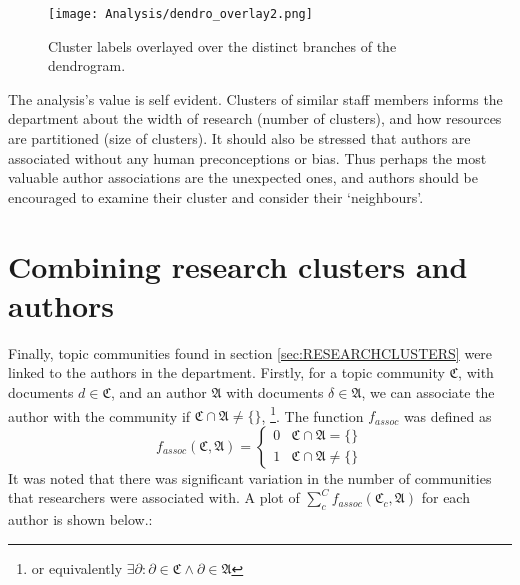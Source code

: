 \begin{center}
\begin{figure}[H]
\label{fig:LABELLEDDENDRO}
  \centering
    \texttt{[image: Analysis/dendro\_overlay2.png]}
    \caption{Cluster labels overlayed over the distinct branches of the dendrogram.}
\end{figure} 
\end{center}
The analysis's value is self evident. Clusters of similar staff members informs the department about the width of research (number of clusters), and how resources are partitioned (size of clusters). It should also be stressed that authors are associated without any human preconceptions or bias. Thus perhaps the most valuable author associations are the unexpected ones, and authors should be encouraged to examine their cluster and consider their `neighbours'.
\section{Combining research clusters and authors}
Finally, topic communities found in section \ref{sec:RESEARCHCLUSTERS} were linked to the authors in the department. Firstly, for a topic community $\mathfrak{C}$, with documents $d \in \mathfrak{C}$, and an author $\mathfrak{A}$ with documents $\delta \in \mathfrak{A}$, we can associate the author with the community if $\mathfrak{C} \cap \mathfrak{A} \neq \{ \}$, \footnote{or equivalently $\exists  \partial : \partial \in \mathfrak{C} \wedge \partial \in \mathfrak{A} $}. The function $f_{assoc}$ was defined as 
\[ 
f_{assoc}\left( \mathfrak{C} , \mathfrak{A} \right) = \begin{cases} 
      0 & \mathfrak{C} \cap \mathfrak{A} = \{ \} \\
      1 & \mathfrak{C} \cap \mathfrak{A} \neq \{ \} 
   \end{cases}
\]
It was noted that there was significant variation in the number of communities that researchers were associated with. A plot of $\sum_c^C f_{assoc} \left( \mathfrak{C}_c , \mathfrak{A} \right)$ for each author is shown below.:
